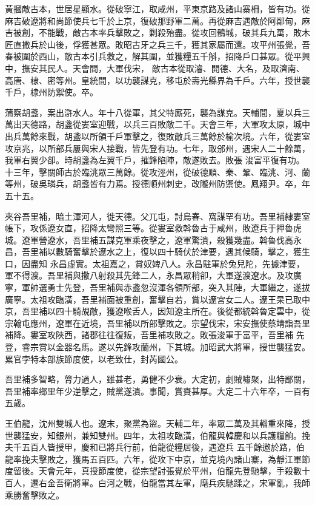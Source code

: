 \begin{pinyinscope}
 黃摑敵古本，世居星顯水。從破寧江，取咸州，平東京路及諸山寨柵，皆有功。從麻吉破遼將和尚節使兵七千於上京，復破那野軍二萬。再從麻吉遇敵於阿鄰甸，麻吉被創，不能戰，敵古本率兵擊敗之，剿殺殆盡。從攻回鶻城，破其兵九萬，敗木匠直撒兵於山後，俘獲甚眾。敗昭古牙之兵三千，獲其家屬而還。攻平州張覺，吾春被圍於西山，敵古本引兵救之，解其圍，並獲糧五千斛，招降戶口甚眾。從平興中，撫安其民人。天會間，大軍伐宋，
 敵古本從取濬、開德、大名，及取濟南、高唐、棣、密等州。皇統間，以功襲謀克，移屯於壽光縣界為千戶。六年，授世襲千戶，棣州防禦使。卒。



 蒲察胡盞，案出滸水人。年十八從軍，其父特廝死，襲為謀克。天輔間，夏以兵三萬出天德路，胡盞從婁室迎戰，以兵三百敗敵二千。天會三年，大軍攻太原，城中出兵萬餘來戰，胡盞以所領千戶軍擊之，復敗敵兵三萬餘於榆次境。六年，從婁室攻京兆，以所部兵屢與宋人接戰，皆先登有功。七年，取邠州，遇宋人二十餘萬，我軍右翼少卻。時胡盞為左翼千戶，摧鋒陷陣，敵遂敗去。敗張
 浚富平復有功。十三年，擊關師古於臨洮眾三萬餘。從攻涇州，從破德順、秦、鞏、臨洮、河、蘭等州，破吳璘兵，胡盞皆有力焉。授德順州刺史，改隴州防禦使。鳳翔尹。卒，年五十五。



 夾谷吾里補，暗土渾河人，徙天德。父兀屯，討烏春、窩謀罕有功。吾里補隸婁室帳下，攻係遼女直，招降太彎照三等。從婁室救斡魯古于咸州，敗遼兵于押魯虎城。遼軍營遼水，吾里補五謀克軍乘夜擊之，遼軍驚潰，殺獲幾盡。斡魯伐高永昌，吾里補以數騎奮擊於遼水之上，復以四十騎伏於津要，遇其候騎，擊之，獲生口，因盡知
 永昌虛實。太祖嘉之，賞奴婢八人。永昌駐軍於兔兒陀，先據津要，軍不得渡。吾里補與撒八射殺其先鋒二人，永昌眾稍卻，大軍遂渡遼水。及攻廣寧，軍帥選勇士先登，吾里補與赤盞忽沒渾各領所部，突入其陣，大軍繼之，遂拔廣寧。太祖攻臨潢，吾里補面被重創，奮擊自若，賞以遼宮女二人。遼王杲已取中京，吾里補以四十騎覘敵，獲遼喉舌人，因知遼主所在。後從都統斡魯定雲中，從宗翰屯應州，遼軍在近境，吾里補以所部擊敗之。宗望伐宋，宋安撫使蔡靖詣吾里補降。婁室攻陜西，諸郡往往復叛，吾里補攻敗之。敗張浚軍于富平，吾里補
 先登，睿宗賞以金器名馬。遂以先鋒攻蘭州，下其城。加昭武大將軍，授世襲猛安。累官孛特本部族節度使，以老致仕，封芮國公。



 吾里補多智略，膂力過人，雖甚老，勇健不少衰。大定初，劇賊嘯聚，出特鄙關，吾里補率鄉里年少逆擊之，賊黨遂潰。事聞，賞賚甚厚。大定二十六年卒，一百有五歲。



 王伯龍，沈州雙城人也。遼末，聚黨為盜。天輔二年，率眾二萬及其輜重來降，授世襲猛安，知銀州，兼知雙州。四年，太祖攻臨潢，伯龍與韓慶和以兵護糧餉。挽夫千五百人皆授甲，慶和已將兵行前，伯龍從糧居後，遇遼兵
 五千餘邀於路，伯龍率挽夫擊敗之，獲馬五百匹。六年，從攻下中京，並克境內諸山寨，為靜江軍節度留後。天會元年，真授節度使，從宗望討張覺於平州，伯龍先登馳擊，手殺數十百人，遷右金吾衛將軍。白河之戰，伯龍當其左軍，麾兵疾馳蹂之，宋軍亂，我師乘勝奮擊敗之。




\end{pinyinscope}
